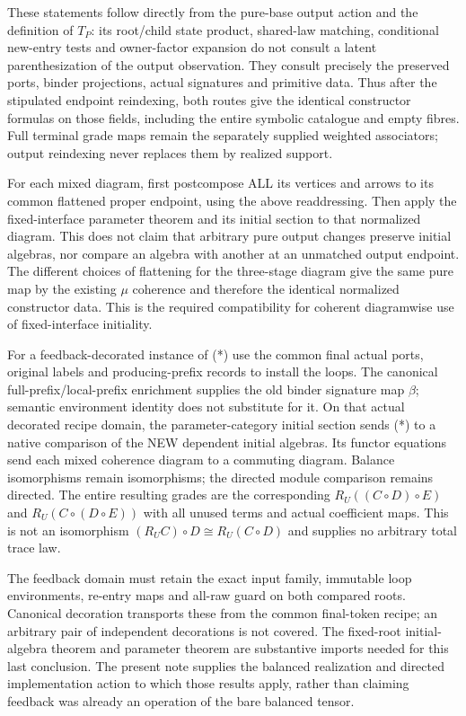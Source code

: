 \documentclass{article}
\begin{document}
These statements follow directly from the pure-base output action and the definition of $T_P$: its root/child state product, shared-law matching, conditional new-entry tests and owner-factor expansion do not consult a latent parenthesization of the output observation. They consult precisely the preserved ports, binder projections, actual signatures and primitive data. Thus after the stipulated endpoint reindexing, both routes give the identical constructor formulas on those fields, including the entire symbolic catalogue and empty fibres. Full terminal grade maps remain the separately supplied weighted associators; output reindexing never replaces them by realized support.

For each mixed diagram, first postcompose ALL its vertices and arrows to its common flattened proper endpoint, using the above readdressing. Then apply the fixed-interface parameter theorem and its initial section to that normalized diagram. This does not claim that arbitrary pure output changes preserve initial algebras, nor compare an algebra with another at an unmatched output endpoint. The different choices of flattening for the three-stage diagram give the same pure map by the existing $\mu$ coherence and therefore the identical normalized constructor data. This is the required compatibility for coherent diagramwise use of fixed-interface initiality.

For a feedback-decorated instance of (*) use the common final actual ports, original labels and producing-prefix records to install the loops. The canonical full-prefix/local-prefix enrichment supplies the old binder signature map $\beta$; semantic environment identity does not substitute for it. On that actual decorated recipe domain, the parameter-category initial section sends (*) to a native comparison of the NEW dependent initial algebras. Its functor equations send each mixed coherence diagram to a commuting diagram. Balance isomorphisms remain isomorphisms; the directed module comparison remains directed. The entire resulting grades are the corresponding $R_U((C\circ D)\circ E)$ and $R_U(C\circ(D\circ E))$ with all unused terms and actual coefficient maps. This is not an isomorphism $(R_U C)\circ D\cong R_U(C\circ D)$ and supplies no arbitrary total trace law.

The feedback domain must retain the exact input family, immutable loop environments, re-entry maps and all-raw guard on both compared roots. Canonical decoration transports these from the common final-token recipe; an arbitrary pair of independent decorations is not covered. The fixed-root initial-algebra theorem and parameter theorem are substantive imports needed for this last conclusion. The present note supplies the balanced realization and directed implementation action to which those results apply, rather than claiming feedback was already an operation of the bare balanced tensor.
\end{document}
